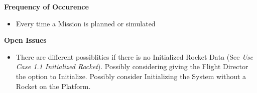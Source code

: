 \documentclass[letterpaper]{article}
\begin{document}
\textbf{Frequency of Occurence}
\begin{itemize}
   \item Every time a Mission is planned or simulated
\end{itemize}
\textbf{Open Issues}
\begin{itemize}
   \item[7b.]There are different possiblities if there is no 
      Initialized Rocket Data (See \textit{Use Case 1.1 Initialized
      Rocket}).  Possibly considering giving the Flight Director the
      option to Initialize.  Possibly consider Initializing the
      System without a Rocket on the Platform.
\end{itemize}
\end{document}
